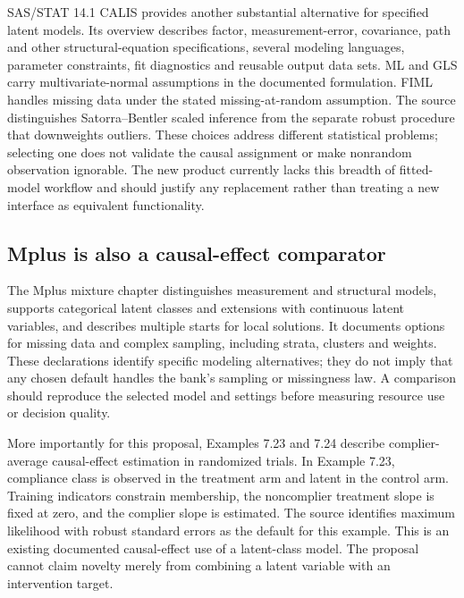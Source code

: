 SAS/STAT 14.1 CALIS provides another substantial alternative for
specified latent models. Its overview describes factor,
measurement-error, covariance, path and other structural-equation
specifications, several modeling languages, parameter constraints, fit
diagnostics and reusable output data sets. ML and GLS carry
multivariate-normal assumptions in the documented formulation. FIML
handles missing data under the stated missing-at-random assumption. The
source distinguishes Satorra--Bentler scaled inference from the separate
robust procedure that downweights outliers. These choices address
different statistical problems; selecting one does not validate the
causal assignment or make nonrandom observation ignorable. The new
product currently lacks this breadth of fitted-model workflow and should
justify any replacement rather than treating a new interface as
equivalent functionality. \citep{exec13_latent_sas_calis}

\hypertarget{mplus-is-also-a-causal-effect-comparator}{%
\subsection{Mplus is also a causal-effect
comparator}\label{mplus-is-also-a-causal-effect-comparator}}

The Mplus mixture chapter distinguishes measurement and structural
models, supports categorical latent classes and extensions with
continuous latent variables, and describes multiple starts for local
solutions. It documents options for missing data and complex sampling,
including strata, clusters and weights. These declarations identify
specific modeling alternatives; they do not imply that any chosen
default handles the bank's sampling or missingness law. A comparison
should reproduce the selected model and settings before measuring
resource use or decision quality.
\citep[pp.165--171]{exec13_latent_mplus}

More importantly for this proposal, Examples 7.23 and 7.24 describe
complier-average causal-effect estimation in randomized trials. In
Example 7.23, compliance class is observed in the treatment arm and
latent in the control arm. Training indicators constrain membership, the
noncomplier treatment slope is fixed at zero, and the complier slope is
estimated. The source identifies maximum likelihood with robust standard
errors as the default for this example. This is an existing documented
causal-effect use of a latent-class model. The proposal cannot claim
novelty merely from combining a latent variable with an intervention
target. \citep[pp.203--205]{exec13_latent_mplus}

